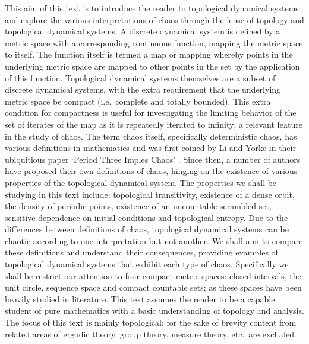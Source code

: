 This aim of this text is to introduce the reader to topological dynamical systems and explore the various interpretations of chaos through the lense of topology and topological dynamical systems. A discrete dynamical system is defined by a metric space with a corresponding continuous function, mapping the metric space to itself. The function itself is termed a map or mapping whereby points in the underlying metric space are mapped to other points in the set by the application of this function. Topological dynamical systems themselves are a subset of discrete dynamical systems, with the extra requirement that the underlying metric space be compact (i.e.\ complete and totally bounded). This extra condition for compactness is useful for investigating the limiting behavior of the set of iterates of the map as it is repeatedly iterated to infinity; a relevant feature in the study of chaos. The term chaos itself, specifically deterministic chaos, has various definitions in mathematics and was first coined by Li and Yorke in their ubiquitious paper `Period Three Imples Chaos' \cite{li-yorke}. Since then, a number of authors have proposed their own definitions of chaos, hinging on the existence of various properties of the topological dynamical system. The properties we shall be studying in this text include: topological transitivity, existence of a dense orbit, the density of periodic points, existence of an uncountable scrambled set, sensitive dependence on initial conditions and topological entropy. Due to the differences between definitions of chaos, topological dynamical systems can be chaotic according to one interpretation but not another. We shall aim to compare these definitions and understand their consequences, providing examples of topological dynamical systems that exhibit each type of chaos. Specifically we shall be restrict our attention to four compact metric spaces: closed intervals, the unit circle, sequence space and compact countable sets; as these spaces have been heavily studied in literature. This text assumes the reader to be a capable student of pure mathematics with a basic understanding of topology and analysis. The focus of this text is mainly topological; for the sake of brevity content from related areas of ergodic theory, group theory, measure theory, etc.\ are excluded.

